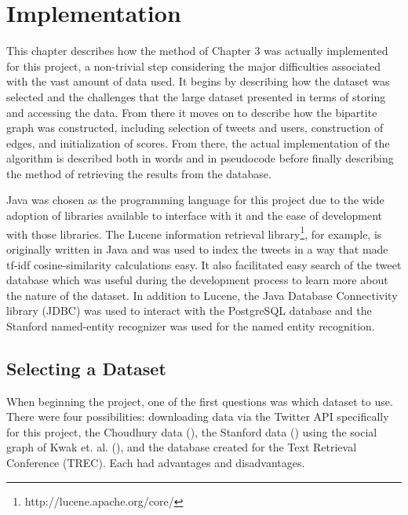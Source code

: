 

\chapter{Implementation}

This chapter describes how the method of Chapter 3 was actually implemented for this project, a non-trivial step considering the major difficulties associated with the vast amount of data used. It begins by describing how the dataset was selected and the challenges that the large dataset presented in terms of storing and accessing the data. From there it moves on to describe how the bipartite graph was constructed, including selection of tweets and users, construction of edges,  and initialization of scores. From there, the actual implementation of the algorithm is described both in words and in pseudocode before finally describing the method of retrieving the results from the database.

Java was chosen as the programming language for this project due to the wide adoption of libraries available to interface with it and the ease of development with those libraries. The Lucene information retrieval library\footnote{http://lucene.apache.org/core/}, for example, is originally written in Java and was used to index the tweets in a way that made tf-idf cosine-similarity calculations easy. It also facilitated easy search of the tweet database which was useful during the development process to learn more about the nature of the dataset. In addition to Lucene, the Java Database Connectivity library (JDBC) was used to interact with the PostgreSQL database and the Stanford named-entity recognizer was used for the named entity recognition.

\section{Selecting a Dataset}
\label{sec:SelectingADataset}


When beginning the project, one of the first questions was which dataset to use. There were four possibilities: downloading data via the Twitter API specifically for this project, the Choudhury data (\cite{Choudhury2010}), the Stanford data (\cite{Yang2011}) using the social graph of Kwak et. al. (\cite{Kwak2010}), and the database created for the Text Retrieval Conference (TREC). Each had advantages and disadvantages.

